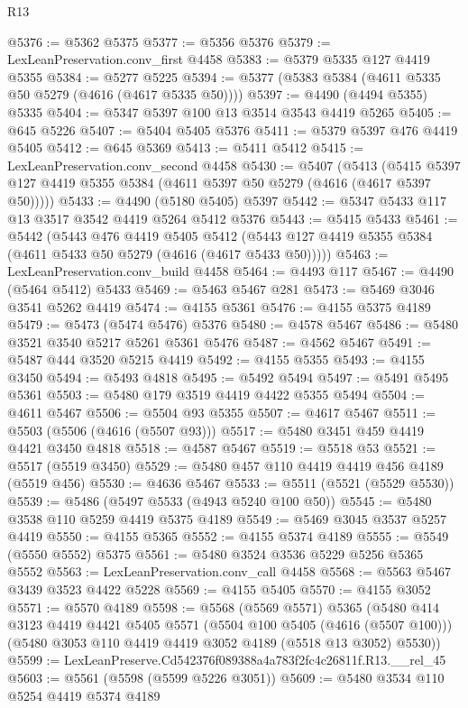 \begin{lexlean}{R13}
\begin{coremodule}
@5376 := @5362 @5375
@5377 := @5356 @5376
@5379 := LexLeanPreservation.conv_first @4458
@5383 := @5379 @5335 @127 @4419 @5355
@5384 := @5277 @5225
@5394 := @5377 (@5383 @5384 (@4611 @5335 @50 @5279 (@4616 (@4617 @5335 @50))))
@5397 := @4490 (@4494 @5355) @5335
@5404 := @5347 @5397 @100 @13 @3514 @3543 @4419 @5265
@5405 := @645 @5226
@5407 := @5404 @5405 @5376
@5411 := @5379 @5397 @476 @4419 @5405
@5412 := @645 @5369
@5413 := @5411 @5412
@5415 := LexLeanPreservation.conv_second @4458
@5430 := @5407
    (@5413 (@5415 @5397 @127 @4419 @5355 @5384 (@4611 @5397 @50 @5279 (@4616 (@4617 @5397 @50)))))
@5433 := @4490 (@5180 @5405) @5397
@5442 := @5347 @5433 @117 @13 @3517 @3542 @4419 @5264 @5412 @5376
@5443 := @5415 @5433
@5461 := @5442
    (@5443
      @476
      @4419
      @5405
      @5412
      (@5443 @127 @4419 @5355 @5384 (@4611 @5433 @50 @5279 (@4616 (@4617 @5433 @50)))))
@5463 := LexLeanPreservation.conv_build @4458
@5464 := @4493 @117
@5467 := @4490 (@5464 @5412) @5433
@5469 := @5463 @5467 @281
@5473 := @5469 @3046 @3541 @5262 @4419
@5474 := @4155 @5361
@5476 := @4155 @5375 @4189
@5479 := @5473 (@5474 @5476) @5376
@5480 := @4578 @5467
@5486 := @5480 @3521 @3540 @5217 @5261 @5361 @5476
@5487 := @4562 @5467
@5491 := @5487 @444 @3520 @5215 @4419
@5492 := @4155 @5355
@5493 := @4155 @3450
@5494 := @5493 @4818
@5495 := @5492 @5494
@5497 := @5491 @5495 @5361
@5503 := @5480 @179 @3519 @4419 @4422 @5355 @5494
@5504 := @4611 @5467
@5506 := @5504 @93 @5355
@5507 := @4617 @5467
@5511 := @5503 (@5506 (@4616 (@5507 @93)))
@5517 := @5480 @3451 @459 @4419 @4421 @3450 @4818
@5518 := @4587 @5467
@5519 := @5518 @53
@5521 := @5517 (@5519 @3450)
@5529 := @5480 @457 @110 @4419 @4419 @456 @4189 (@5519 @456)
@5530 := @4636 @5467
@5533 := @5511 (@5521 (@5529 @5530))
@5539 := @5486 (@5497 @5533 (@4943 @5240 @100 @50))
@5545 := @5480 @3538 @110 @5259 @4419 @5375 @4189
@5549 := @5469 @3045 @3537 @5257 @4419
@5550 := @4155 @5365
@5552 := @4155 @5374 @4189
@5555 := @5549 (@5550 @5552) @5375
@5561 := @5480 @3524 @3536 @5229 @5256 @5365 @5552
@5563 := LexLeanPreservation.conv_call @4458
@5568 := @5563 @5467 @3439 @3523 @4422 @5228
@5569 := @4155 @5405
@5570 := @4155 @3052
@5571 := @5570 @4189
@5598 := @5568
    (@5569 @5571)
    @5365
    (@5480
      @414
      @3123
      @4419
      @4421
      @5405
      @5571
      (@5504 @100 @5405 (@4616 (@5507 @100)))
      (@5480 @3053 @110 @4419 @4419 @3052 @4189 (@5518 @13 @3052) @5530))
@5599 := LexLeanPreserve.Cd542376f089388a4a783f2fc4c26811f.R13.__rel_45
@5603 := @5561 (@5598 (@5599 @5226 @3051))
@5609 := @5480 @3534 @110 @5254 @4419 @5374 @4189

\end{coremodule}
\end{lexlean}
